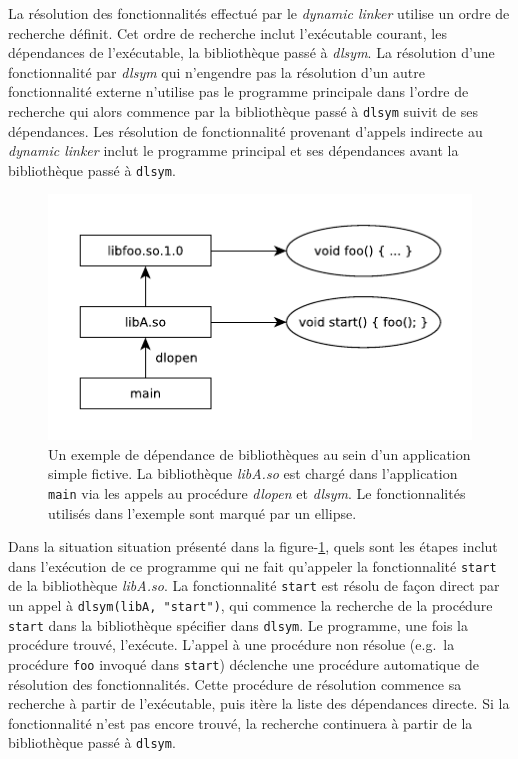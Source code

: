 \documentclass[12pt,initial,twoside,maitrise]{dms}
\numberwithin{equation}{section}
\numberwithin{table}{chapter}
\numberwithin{figure}{chapter}
\begin{document}
La résolution des fonctionnalités effectué par le \textit{dynamic linker} utilise un ordre de recherche
définit. Cet ordre de recherche inclut l'exécutable courant, les dépendances de l'exécutable, la bibliothèque
passé à \textit{dlsym}. La résolution d'une fonctionnalité par \textit{dlsym} qui n'engendre pas la résolution
d'un autre fonctionnalité externe n'utilise pas le programme principale dans l'ordre de recherche qui alors
commence par la bibliothèque passé à \verb|dlsym| suivit de ses dépendances. Les résolution de fonctionnalité
provenant d'appels indirecte au \textit{dynamic linker} inclut le programme principal et ses dépendances avant
la bibliothèque passé à \verb|dlsym|.

\begin{center}
    \begin{figure}[ht]
        \includegraphics{figures/libdeps-ex1.pdf}
        \caption{Un exemple de dépendance de bibliothèques au sein d'un application simple fictive.
            La bibliothèque \textit{libA.so} est chargé dans l'application \texttt{main} via
            les appels au procédure \textit{dlopen} et \textit{dlsym}. Le fonctionnalités utilisés
            dans l'exemple sont marqué par un ellipse.
        }
        \label{fig:deps-ex1}
    \end{figure}
\end{center}

Dans la situation situation présenté dans la figure-\ref{fig:deps-ex1}, quels sont les étapes inclut
dans l'exécution de ce programme qui ne fait qu'appeler la fonctionnalité \texttt{start} de la
bibliothèque \textit{libA.so}. La fonctionnalité \texttt{start} est résolu de façon direct par
un appel à \verb|dlsym(libA, "start")|, qui commence la recherche de la procédure \texttt{start} dans
la bibliothèque spécifier dans \texttt{dlsym}. Le programme, une fois la procédure trouvé, l'exécute.
L'appel à une procédure non résolue (e.g.\ la procédure \texttt{foo} invoqué dans \texttt{start})
déclenche une procédure automatique de résolution des fonctionnalités. Cette procédure de résolution
commence sa recherche à partir de l'exécutable, puis itère la liste des dépendances directe. Si la
fonctionnalité n'est pas encore trouvé, la recherche continuera à partir de la bibliothèque passé à
\texttt{dlsym}.
\end{document}
